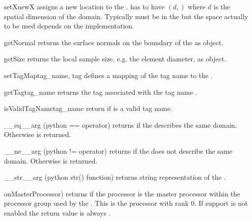 \begin{methoddesc}[Domain]{setX}{newX}
assigns a new location to the \Domain.  has to have \Shape $(d,)$
where $d$ is the spatial dimension of the domain. Typically  must be
in the \ContinuousFunction but the space actually to be used depends on the \Domain implementation.
\end{methoddesc}

\begin{methoddesc}[Domain]{getNormal}{}
returns the surface normals on the boundary of the \Domain as \Data object.
\end{methoddesc}

\begin{methoddesc}[Domain]{getSize}{}
returns the local sample size, e.g. the element diameter, as \Data object.
\end{methoddesc}

\begin{methoddesc}[Domain]{setTagMap}{tag_name, tag}
defines a mapping of the tag name   to the . 
\end{methoddesc}
\begin{methoddesc}[Domain]{getTag}{tag_name}
returns the tag associated with the tag name .
\end{methoddesc}
\begin{methoddesc}[Domain]{isValidTagName}{tag_name}
return \True if  is a valid tag name.
\end{methoddesc}

\begin{methoddesc}[Domain]{__eq__}{arg}
(python == operator) returns \True if the \Domain {} describes the same domain. Otherwise
\False is returned.
\end{methoddesc}

\begin{methoddesc}[Domain]{__ne__}{arg}
(python != operator) returns \True if the \Domain {} does not describe the same domain. 
Otherwise \False is returned.
\end{methoddesc}

\begin{methoddesc}[Domain]{__str__}{arg}
(python str() function) returns string representation of the \Domain.
\end{methoddesc}

\begin{methoddesc}[Domain]{onMasterProcessor)}{}
returns \True if the processor is the master processor within 
the \MPI processor group used by the \Domain. This is the processor with rank 0.
If \MPI support is not enabled the return value is always \True.
\end{methoddesc}

